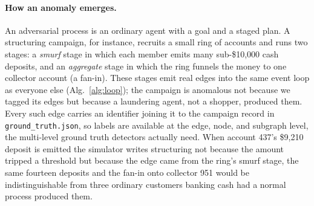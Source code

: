 \documentclass[sigconf,review,anonymous]{acmart}
\begin{document}
\paragraph{How an anomaly emerges.}
An adversarial process is an ordinary agent with a goal and a staged plan. A
structuring campaign, for instance, recruits a small ring of accounts and runs two
stages: a \emph{smurf} stage in which each member emits many sub-\$10{,}000 cash
deposits, and an \emph{aggregate} stage in which the ring funnels the money to one
collector account (a fan-in). These stages emit real edges into the same event
loop as everyone else (Alg.~\ref{alg:loop}); the campaign is anomalous not because
we tagged its edges but because a laundering agent, not a shopper, produced them.
Every such edge carries an identifier joining it to the campaign record in
\texttt{ground\_truth.json}, so labels are available at the edge, node, and
subgraph level, the multi-level ground truth detectors actually need. When account
437's \$9{,}210 deposit is emitted the simulator writes \textsf{structuring} not because
the amount tripped a threshold but because the edge came from the ring's smurf
stage, the same fourteen deposits and the fan-in onto collector 951 would be
indistinguishable from three ordinary customers banking cash had a normal process
produced them.
\end{document}
